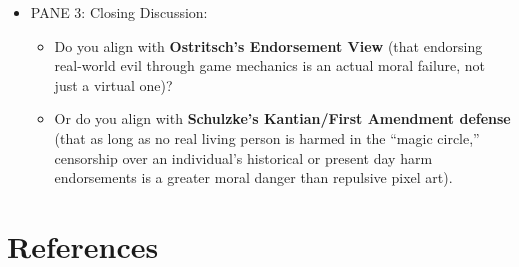 \documentclass[
  a4paper,
  10pt]{article}
\newcounter{none} %
\begin{document}
\begin{itemize}
\begin{itemize}
    \begin{itemize}
    \item
      Why do we freely play historical war games where we slaughter
      ancient Romans, Spartans, or 18th-century soldiers, but recoil at
      games depicting recent genocides or the Holocaust? How much
      \emph{time} or \emph{generational distance} must pass before real
      human trauma becomes ``acceptable'' material for a game engine?
      Does this require being sensitive to human collective trauma much
      like temperature?
    \item
      Reveal a game: \emph{RapeLay. The banned, originally on Amazon's
      website, was a 2006 Japanese adult PC game required players to
      stalk and simulate the rape of a mother and her two daughters,
      earning points for acts of sexual violence, including tailing
      victims on commuter trains and forcing them to have abortions.}

      \begin{itemize}
      \item
        Are some harms eternal thematic human experiences. No amount of
        time will alter acceptance of concepts that are not historical
        and exist always as harms. Without arguing about the law, of
        ``should'' the game be banned, we argue about the information
        ethical nature.
      \item
        Is it a reflection of ethical decay or depravity if a gamer
        ignores the person hood of the people and healthier ways of
        consuming their experiences in data-ified form.
      \end{itemize}
    \end{itemize}
  \item
    PANE 3: Closing Discussion:

    \begin{itemize}
    \item
      Do you align with \textbf{Ostritsch's Endorsement View} (that
      endorsing real-world evil through game mechanics is an actual
      moral failure, not just a virtual one)?
    \item
      Or do you align with \textbf{Schulzke's Kantian/First Amendment
      defense} (that as long as no real living person is harmed in the
      ``magic circle,'' censorship over an individual's historical or
      present day harm endorsements is a greater moral danger than
      repulsive pixel art).
    \end{itemize}
  \end{itemize}
\end{itemize}

\section{References}\label{references}

\printbibliography[heading=none]
\end{document}
